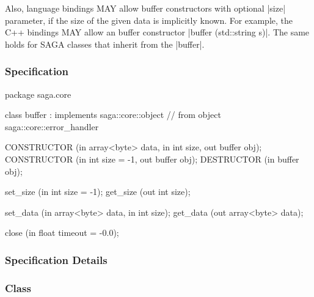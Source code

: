  Also, language bindings MAY allow buffer constructors with
 optional |size| parameter, if the size of the given data is
 implicitly known.  For example, the C++ bindings MAY allow an
 buffer constructor |buffer (std::string s)|.  The same holds
 for SAGA classes that inherit from the |buffer|.
 
 \newpage
 
 \subsubsection{Specification}
 
 \begin{myspec}
  package saga.core
  {
    class buffer : implements   saga::core::object
                // from object  saga::core::error_handler
    {
      CONSTRUCTOR (in  array<byte>  data,
                   in  int          size,
                   out buffer       obj);
      CONSTRUCTOR (in  int          size = -1,
                   out buffer       obj);
      DESTRUCTOR  (in  buffer       obj);
 
      set_size    (in  int          size = -1);
      get_size    (out int          size);
 
      set_data    (in  array<byte>  data, 
                   in  int          size);
      get_data    (out array<byte>  data);
 
      close       (in  float        timeout = -0.0);
    }
  }
 \end{myspec}
 
 
 \subsubsection{Specification Details}
 
 \subsubsection*{Class }
 
